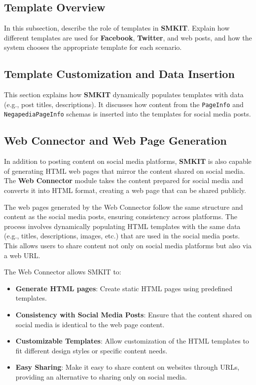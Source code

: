 \subsection{Template Overview}
\label{subsec:template_overview}
In this subsection, describe the role of templates in \textbf{SMKIT}. Explain how different templates are used for \textbf{Facebook}, \textbf{Twitter}, and web posts, and how the system chooses the appropriate template for each scenario.

\subsection{Template Customization and Data Insertion}
\label{subsec:template_customization_and_data_insertion}
This section explains how \textbf{SMKIT} dynamically populates templates with data (e.g., post titles, descriptions). It discusses how content from the \texttt{PageInfo} and \texttt{NegapediaPageInfo} schemas is inserted into the templates for social media posts.

\subsection{Web Connector and Web Page Generation}
\label{subsec:web_connector_and_web_page_generation}
In addition to posting content on social media platforms, \textbf{SMKIT} is also capable of generating HTML web pages that mirror the content shared on social media. The \textbf{Web Connector} module takes the content prepared for social media and converts it into HTML format, creating a web page that can be shared publicly.

The web pages generated by the Web Connector follow the same structure and content as the social media posts, ensuring consistency across platforms. The process involves dynamically populating HTML templates with the same data (e.g., titles, descriptions, images, etc.) that are used in the social media posts. This allows users to share content not only on social media platforms but also via a web URL.

The Web Connector allows SMKIT to:
\begin{itemize}
    \item \textbf{Generate HTML pages}: Create static HTML pages using predefined templates.
    \item \textbf{Consistency with Social Media Posts}: Ensure that the content shared on social media is identical to the web page content.
    \item \textbf{Customizable Templates}: Allow customization of the HTML templates to fit different design styles or specific content needs.
    \item \textbf{Easy Sharing}: Make it easy to share content on websites through URLs, providing an alternative to sharing only on social media.
\end{itemize}

